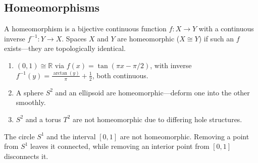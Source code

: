 \subsection{Homeomorphisms}

\begin{definition}
A homeomorphism is a bijective continuous function $f: X \to Y$ with a continuous inverse $f^{-1}: Y \to X$. Spaces $X$ and $Y$ are homeomorphic ($X \cong Y$) if such an $f$ exists—they are topologically identical.
\end{definition}

\begin{example}
\begin{enumerate}
    \item $(0,1) \cong \mathbb{R}$ via $f(x) = \tan(\pi x - \pi/2)$, with inverse $f^{-1}(y) = \frac{\arctan(y)}{\pi} + \frac{1}{2}$, both continuous.
    
    \item A sphere $S^2$ and an ellipsoid are homeomorphic—deform one into the other smoothly.
    
    \item $S^2$ and a torus $T^2$ are not homeomorphic due to differing hole structures.
\end{enumerate}
\end{example}

\begin{example}[Counterexample]
The circle $S^1$ and the interval $[0,1]$ are not homeomorphic. Removing a point from $S^1$ leaves it connected, while removing an interior point from $[0,1]$ disconnects it.
\end{example}

